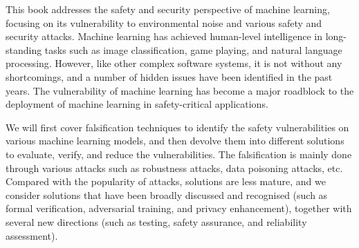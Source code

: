 %
%

\preface




This book addresses the safety and security perspective of machine learning, focusing on its vulnerability to environmental noise and various safety and security attacks. Machine learning has achieved human-level intelligence in long-standing tasks such as image classification, game playing, and natural language processing. However, like other complex software systems, it is not without any shortcomings, and a number of hidden issues have been identified in the past years. The vulnerability of machine learning has become a major roadblock to the deployment of machine learning in safety-critical applications. 


We will first cover falsification techniques to  identify the safety vulnerabilities on various machine learning models, and then devolve them into different solutions to evaluate, verify, and reduce the vulnerabilities. The falsification is mainly done through various attacks such as robustness attacks, data poisoning attacks, etc. Compared with the popularity of attacks, solutions are less mature, and we consider solutions that have been broadly discussed and recognised (such as formal verification, adversarial training, and privacy enhancement), together with several new directions (such as testing, safety assurance, and reliability assessment). 










